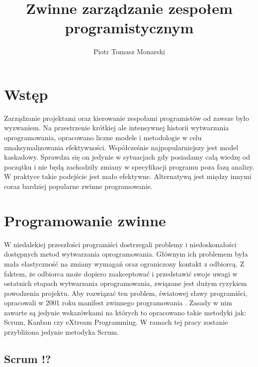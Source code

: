 


\title{Zwinne zarządzanie zespołem programistycznym}
\author{Piotr Tomasz Monarski}



\maketitle

\section{Wstęp}

Zarządzanie projektami oraz kierowanie zespołami programistów od zawsze było wyzwaniem. Na przestrzenie krótkiej ale intensywnej historii wytwarzania oprogramowania, opracowano liczne modele i metodologie w celu zmaksymalizowania efektywności. Współcześnie najpopularniejszy jest model kaskadowy. Sprawdza się on jedynie w sytuacjach gdy posiadamy całą wiedzę od początku i nie będą zachodziły zmiany w specyfikacji programu poza fazą analizy. W praktyce takie podejście jest mało efektywne. Alternatywą jest między innymi coraz bardziej popularne zwinne programowanie. 

\section{Programowanie zwinne}

W niedalekiej przeszłości programiści dostrzegali problemy i niedoskonałości dostępnych metod wytwarzania oprogramowania. Głównym ich problemem była mała elastyczność na zmiany wymagań oraz ograniczony kontakt z odbiorcą. Z faktem, że odbiorca może dopiero zaakceptować i przedstawić swoje uwagi w ostatnich etapach wytwarzania oprogramowania, związane jest dużym ryzykiem powodzenia projektu. Aby rozwiązać ten problem, światowej sławy programiści, opracowali w 2001 roku manifest zwinnego programowania \cite{agile_manifesto}. Zasady w nim zawarte są jedynie wskazówkami na których to opracowano takie metodyki jak: Scrum, Kanban czy eXtream Programming. W ramach tej pracy zostanie przybliżona jedynie metodyka Scrum.

\subsection{Scrum !?}

